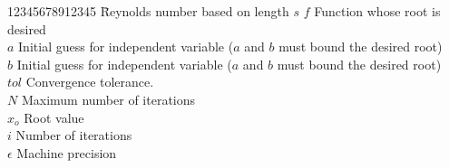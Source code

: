 \begin{tabbing}
    12345678912345 \= Reynolds number based on length $s$ \kill
    $f$         \>  Function whose root is desired \\
    $a$         \>  Initial guess for independent variable ($a$ and $b$ must bound the desired root)\\
    $b$         \>  Initial guess for independent variable ($a$ and $b$ must bound the desired root) \\
    $tol$     \>  Convergence tolerance.\\
    $N$       \> Maximum number of iterations \\
    $x_o$     \>  Root value\\
    $i$         \> Number of iterations\\
    $\epsilon$ \> Machine precision\\
\end{tabbing}

